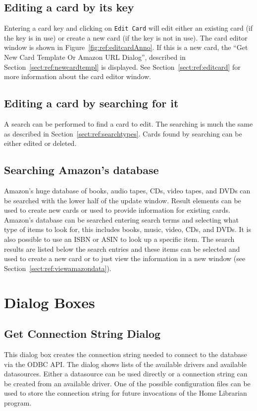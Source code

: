 \subsection{Editing a card by its key}
Entering a card key and clicking on \verb=Edit Card= will edit either
an existing card (if the key is in use) or create a new card (if the
key is not in use). The card editor window is shown in
Figure~\ref{fig:ref:editcardAnno}. If this is a new card, the ``Get New
Card Template Or Amazon URL Dialog'', described in
Section~\ref{sect:ref:newcardtempl} is displayed. See
Section~\ref{sect:ref:editcard} for more information about the card
editor window.

\subsection{Editing a card by searching for it}
A search can be performed to find a card to edit. The searching is much
the same as described in Section~\ref{sect:ref:searchtypes}. Cards found
by searching can be either edited or deleted.

\subsection{Searching Amazon's database}

Amazon's huge database of books, audio tapes, CDs, video tapes, and
DVDs can be searched with the lower half of the update window.  Result
elements can be used to create new cards or used to provide information
for existing cards.  Amazon's database can be searched  entering search
terms and selecting what type of items to look for, this includes
books, music, video, CDs, and DVDs.  It is also possible to use an ISBN
or ASIN to look up a specific item.  The search results are listed below
the search entries and these items can be selected and used to create a
new card or to just view the information in a new window (see
Section~\ref{sect:ref:viewamazondata}).

\section{Dialog Boxes}
\subsection{Get Connection String Dialog}
This dialog box creates the connection string needed to connect to the
database via the ODBC API. The dialog shows lists of the available
drivers and available datasources.  Either a datasource can be used
directly or a connection string can be created from an available
driver. One of the possible configuration files can be used to store
the connection string for future invocations of the Home Librarian
program.
